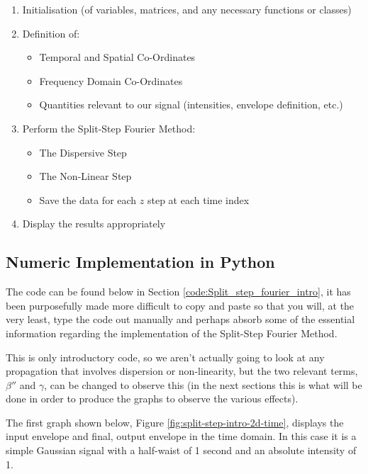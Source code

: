 \documentclass[colorlinks,11pt,a4paper,normalphoto,withhyper,ragged2e]{altareport}
\begin{document}
		\begin{enumerate}[leftmargin=1cm]
			\item Initialisation (of variables, matrices, and any necessary functions or classes)
			\item Definition of:
				\begin{itemize}
					\item Temporal and Spatial Co-Ordinates
					\item Frequency Domain Co-Ordinates
					\item Quantities relevant to our signal (intensities, envelope definition, etc.)
				\end{itemize}
			\item Perform the Split-Step Fourier Method:
				\begin{itemize}
					\item The Dispersive Step
					\item The Non-Linear Step
					\item Save the data for each $z$ step at each time index
				\end{itemize}
			\item Display the results appropriately
		\end{enumerate}
		
		
		\pagebreak
		
		
	\subsection{Numeric Implementation in Python}
		The code can be found below in Section \ref{code:Split_step_fourier_intro}, it has been purposefully made more difficult to copy and paste so that you will, at the very least, type the code out manually and perhaps absorb some of the essential information regarding the implementation of the Split-Step Fourier Method. \linebreak
		
		This is only introductory code, so we aren't actually going to look at any propagation that involves dispersion or non-linearity, but the two relevant terms, $\beta ''$ and $\gamma$, can be changed to observe this (in the next sections this is what will be done in order to produce the graphs to observe the various effects). \linebreak
		
		The first graph shown below, Figure \ref{fig:split-step-intro-2d-time}, displays the input envelope and final, output envelope in the time domain. In this case it is a simple Gaussian signal with a half-waist of 1 second and an absolute intensity of 1. \linebreak
		
\end{document}
